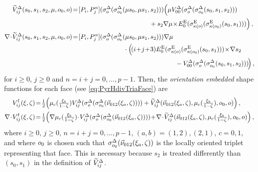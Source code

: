 \begin{equation}
\begin{aligned}
	\tilde{V}_{ij}^\Tri(s_0,s_1,s_2,\mu,\oo_0,\oo)&\!=\![P_i,P_j^\alpha](\sigma_\oo^\Tri(\sigma_{\oo_0}^\Tri(\mu s_0,\mu s_1,s_2)))
		\Big(\mu V_{00}^\Tri(\sigma_\oo^\Tri(\sigma_{\oo_0}^\Tri(s_0,s_1,s_2)))\\
			&\qquad\qquad\qquad\qquad\qquad\qquad
				+s_2\nabla\mu\!\times\! E_0^\E(\sigma_{\kappa(\oo)}^\E(\sigma_{\kappa(\oo_0)}^\E(s_0,s_1)))\Big)\,,\\
	\nabla\!\cdot\!\tilde{V}_{ij}^\Tri(s_0,s_1,s_2,\mu,\oo_0,\oo)
		&\!=\![P_i,P_j^\alpha](\sigma_\oo^\Tri(\sigma_{\oo_0}^\Tri(\mu s_0,\mu s_1,s_2)))\nabla\mu\\
			&\qquad\qquad\qquad\qquad
				\cdot\Big(\!(i\!+\!j\!+\!3)E_0^\E(\sigma_{\kappa(\oo)}^\E(\sigma_{\kappa(\oo_0)}^\E(s_0,s_1)))\!\times\!\nabla s_2\\
					&\qquad\qquad\qquad\qquad\qquad\qquad\qquad\qquad
						-V_{00}^\Tri(\sigma_\oo^\Tri(\sigma_{\oo_0}^\Tri(s_0,s_1,s_2)))\!\Big)\,,
\end{aligned}
\end{equation}
for $i\geq0$, $j\geq0$ and $n=i+j=0,\ldots,p-1$.
Then, the \textit{orientation embedded} shape functions for each face (see \eqref{eq:PyrHdivTriaFace}) are
\begin{equation}
	\begin{aligned}
		V_{ij}^\mathrm{f}(\xieta)
			&\!=\!\textstyle{\frac{1}{2}}\Big(\mu_c(\sxib)V_{ij}^\Tri(\sigma_\oo^\Tri(\sigma_{\oo_0}^\Tri(\vec{\nu}_{012}(\xi_a,\zeta))))
				+\tilde{V}_{ij}^\Tri(\vec{\nu}_{012}(\xi_a,\zeta),\mu_c(\sxib),\oo_0,\oo)\Big)\,,\\
    \nabla\!\cdot\! V_{ij}^\mathrm{f}(\xieta)
    	&\!=\!\textstyle{\frac{1}{2}}\Big(\nabla\mu_c(\sxib)
    		\!\cdot\! V_{ij}^\Tri(\sigma_\oo^\Tri(\sigma_{\oo_0}^\Tri(\vec{\nu}_{012}(\xi_a,\zeta))))
    	\!+\!\nabla\!\cdot\!\tilde{V}_{ij}^\Tri(\vec{\nu}_{012}(\xi_a,\zeta),\mu_c(\sxib),\oo_0,\oo)\Big)\,,	
	\end{aligned}
	\label{eq:SingularityAvoidYesOri}
\end{equation}
where $i\geq0$, $j\geq0$, $n=i+j=0,\ldots,p-1$, $(a,b)=(1,2),(2,1)$, $c=0,1$, and where $o_0$ is chosen such that $\sigma_{o_0}^\Delta(\vec{\nu}_{012}(\xi_a,\zeta))$ is the locally oriented triplet representing that face.
This is necessary because $s_2$ is treated differently than $(s_0,s_1)$ in the definition of $\widetilde{V}_{ij}^\Delta$.



